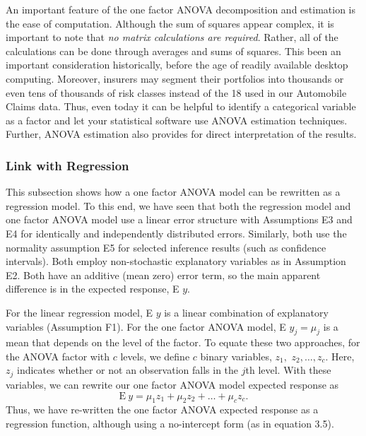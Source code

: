 \linejed

\newpage


An important feature of the one factor ANOVA decomposition and
estimation is the ease of computation. Although the sum of squares
appear complex, it is important to note that \emph{no matrix
calculations are required}. Rather, all of the calculations can be
done through averages and sums of squares. This been an important
consideration historically, before the age of readily available
desktop computing. Moreover, insurers may segment their portfolios into thousands
or even tens of thousands of risk classes instead of the 18 used in our Automobile
Claims data. Thus, even today it can be helpful to identify a categorical variable as
a factor and let your statistical software use ANOVA estimation techniques. Further, ANOVA estimation
also provides for direct interpretation of the results.


\subsubsection*{Link with Regression}

This subsection shows how a one factor ANOVA model can be rewritten
as a regression model. To this end, we have seen that both the
regression model and one factor ANOVA model use a linear error
structure with Assumptions E3 and E4 for identically and
independently distributed errors. Similarly, both use the normality
assumption E5 for selected inference results (such as confidence
intervals). Both employ non-stochastic explanatory variables as in
Assumption E2. Both have an additive (mean zero) error term, so the
main apparent difference is in the expected response, E $y$.

For the linear regression model, E $y$ is a linear combination of
explanatory variables (Assumption F1). For the one factor ANOVA model, E $y_j =
\mu_j$ is a mean that depends on the level of the factor. To equate
these two approaches, for the ANOVA factor with $c$ levels, we
define $c$ binary variables, $z_1,$ $z_2,\ldots ,z_c$. Here, $z_j$
indicates whether or not an observation falls in the $j$th level.
With these variables, we can rewrite our one factor ANOVA model
expected response as
\begin{equation}\label{E4:OneFactor}
\textrm{E}~y = \mu_1 z_1 + \mu_2 z_2 + \ldots + \mu_c z_c.
\end{equation}
Thus, we have re-written the one factor ANOVA expected response as a
regression function, although using a no-intercept form (as in
equation 3.5).

